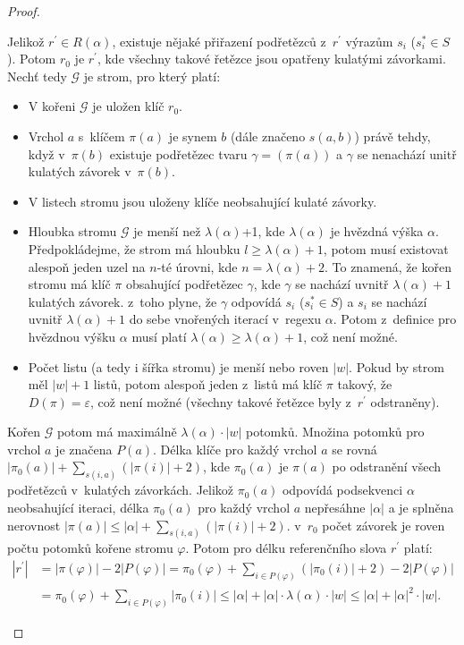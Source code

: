 \documentclass[thesis=B,czech]{FITthesis}[2019/12/23]
\theoremstyle{definition}
\begin{document}
\begin{proof}
\begin{itemize}
{	Jelikož $r^\prime \in R(\alpha)$, existuje nějaké přiřazení podřetězců z~$r^\prime$ výrazům $s_i$ ($s_i^\ast \in S$). Potom $r_0$ je $r^\prime$, kde všechny takové řetězce jsou opatřeny kulatými závorkami. Nechť tedy $\mathcal{G}$ je strom, pro který platí:
	\begin{itemize}  \item{V kořeni $\mathcal{G}$ je uložen klíč $r_0$.}
				\item{Vrchol $a$ s~klíčem $\pi(a)$ je synem $b$ (dále značeno $s(a, b)$) právě tehdy, když v~$\pi(b)$ existuje podřetězec tvaru $\gamma= (\pi(a))$ a $\gamma$ se nenachází unitř kulatých závorek v~$\pi(b)$.}
				\item{V listech stromu jsou uloženy klíče neobsahující kulaté závorky.}
				\item{Hloubka stromu $\mathcal{G}$ je menší než $\lambda(\alpha)$+1, kde $\lambda(\alpha)$ je hvězdná výška $\alpha$. Předpokládejme, že strom má hloubku $l \ge \lambda(\alpha)+1$, potom musí existovat alespoň jeden uzel na $n$-té úrovni, kde $n = \lambda(\alpha)+2$. To znamená, že kořen stromu má klíč $\pi$ obsahující podřetězec $\gamma$, kde $\gamma$ se nachází uvnitř $\lambda(\alpha)+1$ kulatých závorek. z~toho plyne, že $\gamma$ odpovídá $s_i$ ($s_i^\ast \in S$) a $s_i$ se nachází uvnitř $\lambda(\alpha)+1$ do sebe vnořených iterací v~regexu $\alpha$. Potom z~definice pro hvězdnou výšku $\alpha$ musí platí $\lambda(\alpha) \ge \lambda(\alpha)+1$, což není možné.}
				\item{Počet listu (a tedy i šířka stromu) je menší nebo roven $|w|$. Pokud by strom měl $|w|+1$ listů, potom alespoň jeden z~listů má klíč $\pi$ takový, že $D(\pi)=\varepsilon$, což není možné (všechny takové řetězce byly z~$r^\prime$ odstraněny).}
	\end{itemize}
Kořen $\mathcal{G}$ potom má maximálně $\lambda(\alpha)\cdot|w|$ potomků. Množina potomků pro vrchol $a$ je značena $P(a)$. Délka klíče pro každý vrchol $a$ se rovná $|\pi_{0}(a)| + \sum_{s(i, a)}(|\pi(i)|+2)$, kde $\pi_{0}(a)$ je $\pi(a)$ po odstranění všech podřetězců v~kulatých závorkách. Jelikož $\pi_{0}(a)$ odpovídá podsekvenci $\alpha$ neobsahující iteraci, délka $\pi_{0}(a)$ pro každý vrchol $a$ nepřesáhne $|\alpha|$ a je splněna nerovnost $|\pi(a)| \le |\alpha| + \sum_{s(i, a)}(|\pi(i)|+2)$. v~$r_0$ počet závorek je roven počtu potomků kořene stromu $\varphi$. Potom pro délku referenčního slova $r^\prime$ platí: 
\begin{equation*}\begin{split}|r^{\prime}|&=|\pi(\varphi)|-2|P(\varphi)|=\pi_0(\varphi)+\sum_{i \in P(\varphi)}(|\pi_{0}(i)|+2) - 2|P(\varphi)| \\&= \pi_{0}(\varphi)+\sum_{i \in P(\varphi)}|\pi_{0}(i)| \le |\alpha|+|\alpha|\cdot\lambda(\alpha)\cdot|w| \le |\alpha|+|\alpha|^2\cdot|w|.
\end{split}\end{equation*}
	}
\end{itemize}
\end{proof}
\end{document}
